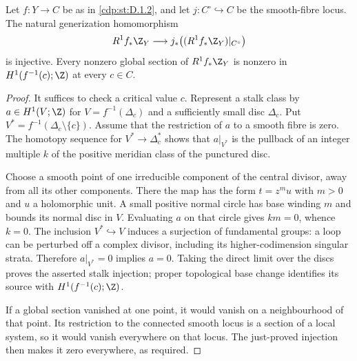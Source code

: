 
\begin{proposition}\label{cdp:st:D.1.8}
Let $f:Y\to C$ be as in \ref{cdp:st:D.1.2}, and let $j:C^\circ\hookrightarrow C$
be the smooth-fibre locus. The natural generization homomorphism
\[
R^1f_*\Z_Y\longrightarrow
j_*\bigl((R^1f_*\Z_Y)|_{C^\circ}\bigr)
\]
is injective. Every nonzero global section of $R^1f_*\Z_Y$ is
nonzero in $H^1(f^{-1}(c);\Z)$ at every $c\in C$.
\end{proposition}
\begin{proof}
It suffices to check a critical value $c$. Represent a stalk class
by $a\in H^1(V;\Z)$ for $V=f^{-1}(\Delta_c)$ and a sufficiently
small disc $\Delta_c$. Put $V^*=f^{-1}(\Delta_c\setminus\{c\})$.
Assume that the restriction of $a$ to a smooth fibre is zero.
The homotopy sequence for $V^*\to\Delta_c^*$ shows that
$a|_{V^*}$ is the pullback of an integer multiple $k$ of the
positive meridian class of the punctured disc.

Choose a smooth point of one irreducible component of the central
divisor, away from all its other components. There the map has
the form $t=z^m u$ with $m>0$ and $u$ a holomorphic unit.
A small positive normal circle has base winding $m$ and bounds
its normal disc in $V$. Evaluating $a$ on that circle gives
$km=0$, whence $k=0$.
The inclusion $V^*\hookrightarrow V$ induces a surjection of
fundamental groups: a loop can be perturbed off a complex divisor,
including its higher-codimension singular strata. Therefore
$a|_{V^*}=0$ implies $a=0$.
Taking the direct limit over the discs proves the asserted stalk
injection; proper topological base change identifies its source
with $H^1(f^{-1}(c);\Z)$.

If a global section vanished at one point, it would vanish on a
neighbourhood of that point. Its restriction to the connected
smooth locus is a section of a local system, so it would vanish
everywhere on that locus. The just-proved injection then makes
it zero everywhere, as required.
\end{proof}


